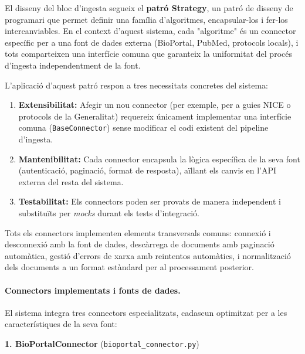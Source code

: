\documentclass[CAT]{TFUOC}%
\begin{document}
El disseny del bloc d'ingesta segueix el \textbf{patró Strategy}, un patró de disseny de programari que permet definir una família d'algoritmes, encapsular-los i fer-los intercanviables. En el context d'aquest sistema, cada "algoritme" és un connector específic per a una font de dades externa (BioPortal, PubMed, protocols locals), i tots comparteixen una interfície comuna que garanteix la uniformitat del procés d'ingesta independentment de la font.

L'aplicació d'aquest patró respon a tres necessitats concretes del sistema:

\begin{enumerate}
    \item \textbf{Extensibilitat:} Afegir un nou connector (per exemple, per a guies NICE o protocols de la Generalitat) requereix únicament implementar una interfície comuna (\texttt{BaseConnector}) sense modificar el codi existent del pipeline d'ingesta.
    
    \item \textbf{Mantenibilitat:} Cada connector encapsula la lògica específica de la seva font (autenticació, paginació, format de resposta), aïllant els canvis en l'API externa del resta del sistema.
    
    \item \textbf{Testabilitat:} Els connectors poden ser provats de manera independent i substituïts per \textit{mocks} durant els tests d'integració.
\end{enumerate}

Tots els connectors implementen elements transversals comuns: connexió i desconnexió amb la font de dades, descàrrega de documents amb paginació automàtica, gestió d'errors de xarxa amb reintentos automàtics, i normalització dels documents a un format estàndard per al processament posterior.

\paragraph{Connectors implementats i fonts de dades.}

El sistema integra tres connectors especialitzats, cadascun optimitzat per a les característiques de la seva font:

\textbf{1. BioPortalConnector} (\texttt{bioportal\_connector.py})
\end{document}
